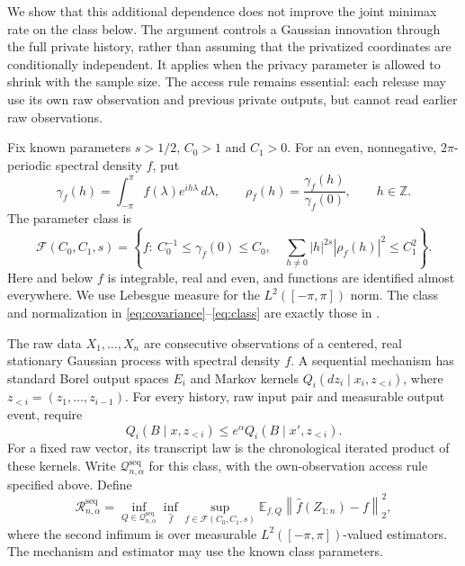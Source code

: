 \documentclass[11pt]{article}
\theoremstyle{remark}
\newcommand{\Z}{\mathbb Z}
\newcommand{\E}{\mathbb E}
\newcommand{\F}{\mathcal F}
\newcommand{\risk}{\mathcal R^{\mathrm{seq}}_{n,\alpha}}
\newcommand{\norm}[1]{\left\lVert#1\right\rVert}
\begin{document}
We show that this additional dependence does not improve the joint minimax
rate on the class below. The argument controls a Gaussian innovation through
the full private history, rather than assuming that the privatized coordinates
are conditionally independent. It applies when the privacy parameter is
allowed to shrink with the sample size. The access rule remains essential:
each release may use its own raw observation and previous private outputs,
but cannot read earlier raw observations.

Fix known parameters $s>1/2$, $C_0>1$ and $C_1>0$. For an even, nonnegative,
$2\pi$-periodic spectral density $f$, put
\begin{equation}\label{eq:covariance}
 \gamma_f(h)=\int_{-\pi}^{\pi}f(\lambda)e^{ih\lambda}\,d\lambda,
 \qquad \rho_f(h)=\frac{\gamma_f(h)}{\gamma_f(0)},\qquad h\in\Z.
\end{equation}
The parameter class is
\begin{equation}\label{eq:class}
 \F(C_0,C_1,s)=\left\{f:\ C_0^{-1}\le\gamma_f(0)\le C_0,
 \quad \sum_{h\ne0}|h|^{2s}|\rho_f(h)|^2\le C_1^2\right\}.
\end{equation}
Here and below $f$ is integrable, real and even, and functions are identified
almost everywhere. We use Lebesgue measure for the $L^2([-\pi,\pi])$ norm.
The class and normalization in \eqref{eq:covariance}--\eqref{eq:class} are
exactly those in \cite[(3)]{IR}.

The raw data $X_1,\ldots,X_n$ are consecutive observations of a centered,
real stationary Gaussian process with spectral density $f$. A sequential
mechanism has standard Borel output spaces $E_i$ and Markov kernels
$Q_i(dz_i\mid x_i,z_{<i})$, where $z_{<i}=(z_1,\ldots,z_{i-1})$.
For every history, raw input pair and measurable output event, require
\begin{equation}\label{eq:privacy}
 Q_i(B\mid x,z_{<i})\le e^\alpha Q_i(B\mid x',z_{<i}).
\end{equation}
For a fixed raw vector, its transcript law is the chronological iterated
product of these kernels. Write $\mathcal Q^{\mathrm{seq}}_{n,\alpha}$ for
this class, with the own-observation access rule specified above. Define
\begin{equation}\label{eq:risk}
 \risk=\inf_{Q\in\mathcal Q^{\mathrm{seq}}_{n,\alpha}}
 \inf_{\widehat f}\sup_{f\in\F(C_0,C_1,s)}
 \E_{f,Q}\norm{\widehat f(Z_{1:n})-f}_2^2,
\end{equation}
where the second infimum is over measurable $L^2([-\pi,\pi])$-valued
estimators. The mechanism and estimator may use the known class parameters.
\end{document}
